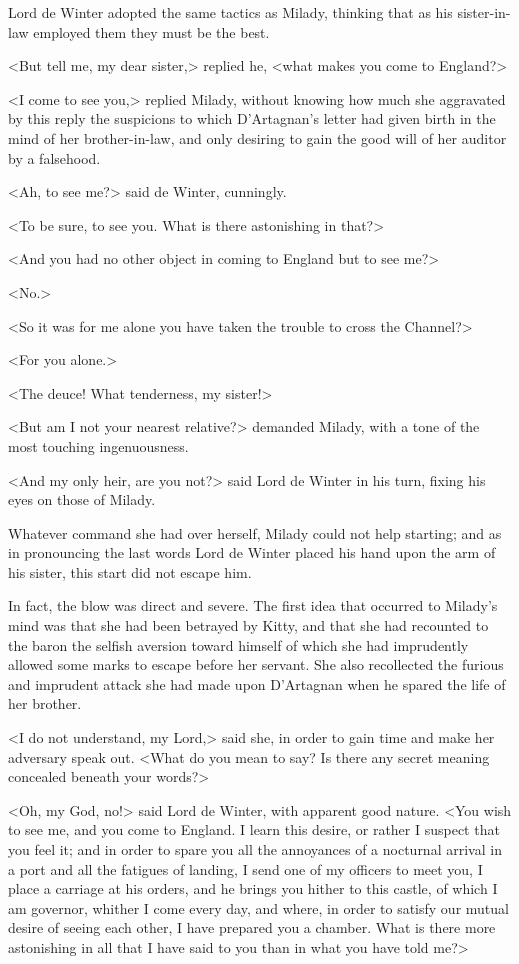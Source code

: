 Lord de Winter adopted the same tactics as Milady, thinking that as his sister-in-law employed them they must be the best. 

<But tell me, my dear sister,> replied he, <what makes you come to England?> 

<I come to see you,> replied Milady, without knowing how much she aggravated by this reply the suspicions to which D'Artagnan's letter had given birth in the mind of her brother-in-law, and only desiring to gain the good will of her auditor by a falsehood. 

<Ah, to see me?> said de Winter, cunningly. 

<To be sure, to see you. What is there astonishing in that?> 

<And you had no other object in coming to England but to see me?> 

<No.> 

<So it was for me alone you have taken the trouble to cross the Channel?> 

<For you alone.> 

<The deuce! What tenderness, my sister!> 

<But am I not your nearest relative?> demanded Milady, with a tone of the most touching ingenuousness. 

<And my only heir, are you not?> said Lord de Winter in his turn, fixing his eyes on those of Milady. 

Whatever command she had over herself, Milady could not help starting; and as in pronouncing the last words Lord de Winter placed his hand upon the arm of his sister, this start did not escape him. 

In fact, the blow was direct and severe. The first idea that occurred to Milady's mind was that she had been betrayed by Kitty, and that she had recounted to the baron the selfish aversion toward himself of which she had imprudently allowed some marks to escape before her servant. She also recollected the furious and imprudent attack she had made upon D'Artagnan when he spared the life of her brother. 

<I do not understand, my Lord,> said she, in order to gain time and make her adversary speak out. <What do you mean to say? Is there any secret meaning concealed beneath your words?> 

<Oh, my God, no!> said Lord de Winter, with apparent good nature. <You wish to see me, and you come to England. I learn this desire, or rather I suspect that you feel it; and in order to spare you all the annoyances of a nocturnal arrival in a port and all the fatigues of landing, I send one of my officers to meet you, I place a carriage at his orders, and he brings you hither to this castle, of which I am governor, whither I come every day, and where, in order to satisfy our mutual desire of seeing each other, I have prepared you a chamber. What is there more astonishing in all that I have said to you than in what you have told me?> 


